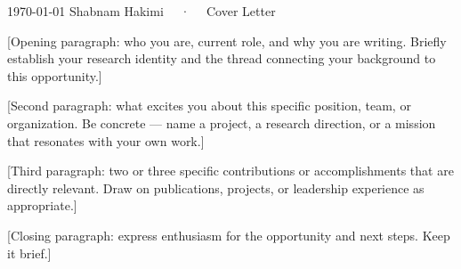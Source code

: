\documentclass[11pt, a4paper]{awesome-cv}
\begin{document}
\makecvheader[C]

\makecvfooter
  {\today}
  {Shabnam Hakimi ~~·~~ Cover Letter}
  {}

\makelettertitle

\begin{cvletter}

[Opening paragraph: who you are, current role, and why you are writing.
Briefly establish your research identity and the thread connecting your
background to this opportunity.]

[Second paragraph: what excites you about this specific position, team,
or organization. Be concrete — name a project, a research direction, or
a mission that resonates with your own work.]

[Third paragraph: two or three specific contributions or accomplishments
that are directly relevant. Draw on publications, projects, or leadership
experience as appropriate.]

[Closing paragraph: express enthusiasm for the opportunity and next steps.
Keep it brief.]

\end{cvletter}

\makeletterclosing
\end{document}
